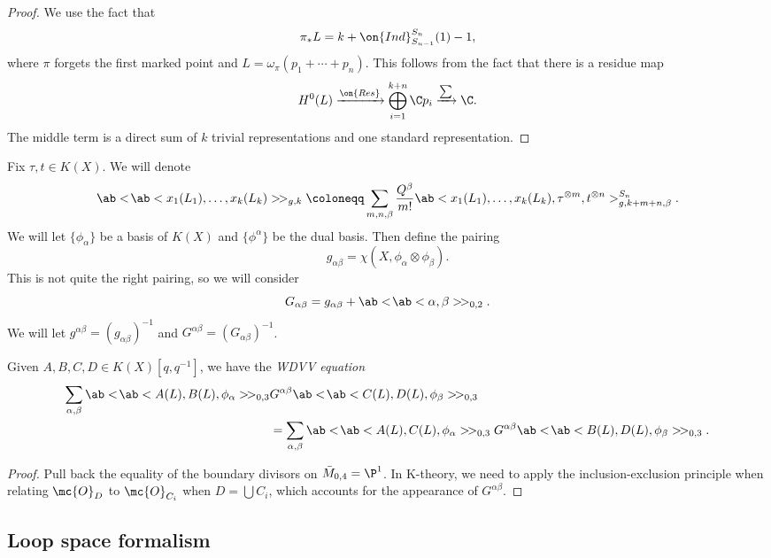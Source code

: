 \begin{proof}
    We use the fact that
    \[ \pi_* L = k + \on{Ind}_{S_{n-1}}^{S_n}(1) - 1, \]
    where \(\pi\) forgets the first marked point and \(L = \omega_{\pi} (p_1 + \cdots + p_n)\). This follows from the fact that there is a residue map
    \[ H^0(L) \xrightarrow{\on{Res}} \bigoplus_{i=1}^{k+n} \C p_i \xrightarrow{\sum} \C. \]
    The middle term is a direct sum of \(k\) trivial representations and one standard representation.
\end{proof}

\begin{notn}
    Fix \(\tau, t \in K(X)\). We will denote
    \[ \ab<\!\ab<x_1(L_1), \ldots, x_k(L_k)>\!>_{g,k} \coloneqq \sum_{m,n,\beta} \frac{Q^{\beta}}{m!} \ab<x_1(L_1), \ldots, x_k(L_k), \tau^{\otimes m}, t^{\otimes n}>_{g,k+m+n,\beta}^{S_n}. \]
    We will let \(\{\phi_{\alpha}\}\) be a basis of \(K(X)\) and \(\{\phi^{\alpha}\}\) be the dual basis. Then define the pairing
    \[ g_{\alpha\beta} = \chi(X, \phi_{\alpha} \otimes \phi_{\beta}). \]
    This is not quite the right pairing, so we will consider
    \[ G_{\alpha\beta} = g_{\alpha\beta} + \ab<\!\ab<\alpha,\beta>\!>_{0,2}. \]
    We will let \(g^{\alpha\beta} = (g_{\alpha\beta})^{-1}\) and \(G^{\alpha\beta} = (G_{\alpha\beta})^{-1}\).
\end{notn}

\begin{lem}
    Given \(A,B,C,D \in K(X)[q,q^{-1}]\), we have the \textit{WDVV equation}
    \begin{align*}
        \sum_{\alpha,\beta} \ab<\!\ab< A(L), B(L), \phi_{\alpha}>\! >_{0,3}& G^{\alpha\beta}\ab<\!\ab< C(L), D(L), \phi_{\beta}>\! >_{0,3} \\
        &= \sum_{\alpha,\beta} \ab<\!\ab< A(L), C(L), \phi_{\alpha}>\! >_{0,3} G^{\alpha\beta}\ab<\!\ab< B(L), D(L), \phi_{\beta}>\! >_{0,3}. 
    \end{align*}
\end{lem}

\begin{proof}
    Pull back the equality of the boundary divisors on \(\bar{M}_{0,4} = \P^1\). In K-theory, we need to apply the inclusion-exclusion principle when relating \(\mc{O}_D\) to \(\mc{O}_{C_i}\) when \(D = \bigcup C_i\), which accounts for the appearance of \(G^{\alpha\beta}\).
\end{proof}

\subsection{Loop space formalism}%
\label{sub:Loop space formalism}

